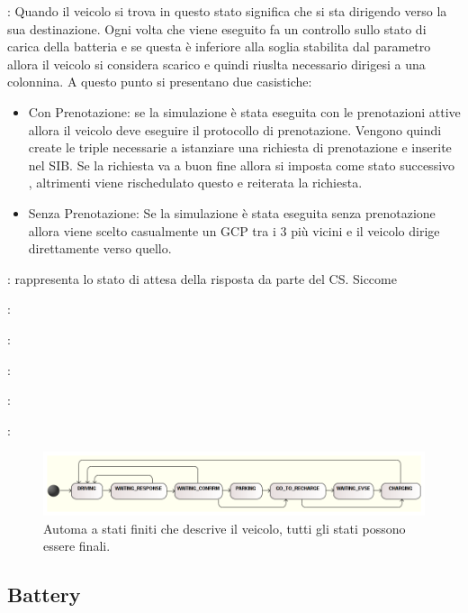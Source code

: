 \begin{description}
	\item \label{state:driving} : Quando il veicolo si trova in questo stato significa che si sta dirigendo verso la sua destinazione. Ogni volta che viene eseguito fa un controllo sullo stato di carica della batteria e se questa è inferiore alla soglia stabilita dal parametro  allora il veicolo si considera scarico e quindi riuslta necessario dirigesi a una colonnina. A questo punto si presentano due casistiche:
	\begin{itemize}
		\item{Con Prenotazione}: se la simulazione è stata eseguita con le prenotazioni attive allora il veicolo deve eseguire il protocollo di prenotazione. Vengono quindi create le triple necessarie a istanziare una richiesta di prenotazione e inserite nel SIB. Se la richiesta va a buon fine allora si imposta come stato successivo , altrimenti viene rischedulato questo e reiterata la richiesta.
		\item{Senza Prenotazione}: Se la simulazione è stata eseguita senza prenotazione allora viene scelto casualmente un GCP tra i 3 più vicini e il veicolo dirige direttamente verso quello.
	\end{itemize}
	\item {}: rappresenta lo stato di attesa della risposta da parte del CS. Siccome 
	\item {}:
	\item {}:
	\item {}:
	\item {}:
	\item {}:
\end{description}
	


\begin{figure}
	\centering
	\includegraphics[width=1.0\textwidth]{assets/car-fsmd.png}
	\caption{Automa a stati finiti che descrive il veicolo, tutti gli stati possono essere finali.}
	\label{fig:car-fsmd}
\end{figure}

\subsection{Battery}\label{sec:battery}

